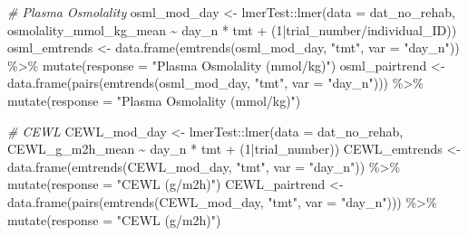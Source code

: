 \documentclass[
]{article}
\newenvironment{Shaded}{\begin{snugshade}}{\end{snugshade}}
\newcommand{\AttributeTok}[1]{\textcolor[rgb]{0.77,0.63,0.00}{#1}}
\newcommand{\CommentTok}[1]{\textcolor[rgb]{0.56,0.35,0.01}{\textit{#1}}}
\newcommand{\DecValTok}[1]{\textcolor[rgb]{0.00,0.00,0.81}{#1}}
\newcommand{\FunctionTok}[1]{\textcolor[rgb]{0.00,0.00,0.00}{#1}}
\newcommand{\NormalTok}[1]{#1}
\newcommand{\OtherTok}[1]{\textcolor[rgb]{0.56,0.35,0.01}{#1}}
\newcommand{\SpecialCharTok}[1]{\textcolor[rgb]{0.00,0.00,0.00}{#1}}
\newcommand{\StringTok}[1]{\textcolor[rgb]{0.31,0.60,0.02}{#1}}
\begin{document}
\begin{Shaded}
\begin{Highlighting}[]
\CommentTok{\# Plasma Osmolality}
\NormalTok{osml\_mod\_day }\OtherTok{\textless{}{-}}\NormalTok{ lmerTest}\SpecialCharTok{::}\FunctionTok{lmer}\NormalTok{(}\AttributeTok{data =}\NormalTok{ dat\_no\_rehab,}
\NormalTok{                              osmolality\_mmol\_kg\_mean }\SpecialCharTok{\textasciitilde{}}\NormalTok{ day\_n }\SpecialCharTok{*}\NormalTok{ tmt }\SpecialCharTok{+} 
\NormalTok{                              (}\DecValTok{1}\SpecialCharTok{|}\NormalTok{trial\_number}\SpecialCharTok{/}\NormalTok{individual\_ID))}
\NormalTok{osml\_emtrends }\OtherTok{\textless{}{-}} \FunctionTok{data.frame}\NormalTok{(}\FunctionTok{emtrends}\NormalTok{(osml\_mod\_day, }\StringTok{"tmt"}\NormalTok{, }\AttributeTok{var =} \StringTok{"day\_n"}\NormalTok{)) }\SpecialCharTok{\%\textgreater{}\%}
  \FunctionTok{mutate}\NormalTok{(}\AttributeTok{response =} \StringTok{"Plasma Osmolality (mmol/kg)"}\NormalTok{)}
\NormalTok{osml\_pairtrend }\OtherTok{\textless{}{-}} \FunctionTok{data.frame}\NormalTok{(}\FunctionTok{pairs}\NormalTok{(}\FunctionTok{emtrends}\NormalTok{(osml\_mod\_day, }\StringTok{"tmt"}\NormalTok{, }\AttributeTok{var =} \StringTok{"day\_n"}\NormalTok{))) }\SpecialCharTok{\%\textgreater{}\%}
  \FunctionTok{mutate}\NormalTok{(}\AttributeTok{response =} \StringTok{"Plasma Osmolality (mmol/kg)"}\NormalTok{)}

\CommentTok{\# CEWL}
\NormalTok{CEWL\_mod\_day }\OtherTok{\textless{}{-}}\NormalTok{ lmerTest}\SpecialCharTok{::}\FunctionTok{lmer}\NormalTok{(}\AttributeTok{data =}\NormalTok{ dat\_no\_rehab,}
\NormalTok{                              CEWL\_g\_m2h\_mean }\SpecialCharTok{\textasciitilde{}}\NormalTok{ day\_n }\SpecialCharTok{*}\NormalTok{ tmt }\SpecialCharTok{+} 
\NormalTok{                              (}\DecValTok{1}\SpecialCharTok{|}\NormalTok{trial\_number))}
\NormalTok{CEWL\_emtrends }\OtherTok{\textless{}{-}} \FunctionTok{data.frame}\NormalTok{(}\FunctionTok{emtrends}\NormalTok{(CEWL\_mod\_day, }\StringTok{"tmt"}\NormalTok{, }\AttributeTok{var =} \StringTok{"day\_n"}\NormalTok{)) }\SpecialCharTok{\%\textgreater{}\%}
  \FunctionTok{mutate}\NormalTok{(}\AttributeTok{response =} \StringTok{"CEWL (g/m2h)"}\NormalTok{)}
\NormalTok{CEWL\_pairtrend }\OtherTok{\textless{}{-}} \FunctionTok{data.frame}\NormalTok{(}\FunctionTok{pairs}\NormalTok{(}\FunctionTok{emtrends}\NormalTok{(CEWL\_mod\_day, }\StringTok{"tmt"}\NormalTok{, }\AttributeTok{var =} \StringTok{"day\_n"}\NormalTok{))) }\SpecialCharTok{\%\textgreater{}\%}
  \FunctionTok{mutate}\NormalTok{(}\AttributeTok{response =} \StringTok{"CEWL (g/m2h)"}\NormalTok{)}


\end{Highlighting}
\end{Shaded}
\end{document}
